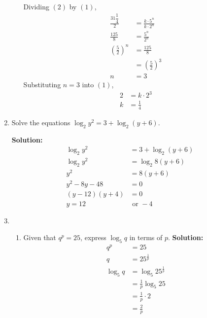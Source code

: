 \documentclass{report}
\newcommand{\sol}{\vspace{0.2cm}\textbf{Solution:}\vspace{0.2cm}}
\begin{document}
\begin{multicols*}{2}
\begin{enumerate}[leftmargin=*]
\begin{enumerate}
                        Dividing $(2)$ by $(1)$,
                        \begin{align*}
                            \frac{31 \dfrac{1}{4}}{2}    & = \frac{k \cdot 5^{n}}{k \cdot 2^{n}} \\
                            \frac{125}{8}                & = \frac{5^{n}}{2^{n}}                 \\
                            \left(\frac{5}{2}\right)^{n} & = \frac{125}{8}                       \\
                                                         & = \left(\frac{5}{2}\right)^{3}        \\
                            n                            & = 3
                        \end{align*}
                        Substituting $n=3$ into $(1)$,
                        \begin{align*}
                            2 & = k \cdot 2^{3} \\
                            k & = \frac{1}{4}
                        \end{align*}
              \end{enumerate}

        \item Solve the equations $\log _2 y^2=3+\log _2(y+6)$.

              \sol{}
              \begin{align*}
                  \log _2 y^2        & = 3+\log _2(y+6) \\
                  \log _2 y^2        & = \log _2 8(y+6) \\
                  y^2                & = 8(y+6)         \\
                  y^2 - 8y - 48      & = 0              \\
                  (y-12)(y+4)        & = 0              \\
                  y             = 12 & \text{ or } -4
              \end{align*}

        \item \begin{enumerate}
                  \item Given that $q^p=25$, express $\log _5 q$ in terms of $p$. \sol{}
                        \begin{align*}
                            q^p      & = 25                      \\
                            q        & = 25^{\frac{1}{p}}        \\
                            \log_5 q & = \log_5 25^{\frac{1}{p}} \\
                                     & = \frac{1}{p} \log_5 25   \\
                                     & = \frac{1}{p} \cdot 2     \\
                                     & = \frac{2}{p}
                        \end{align*}


\end{enumerate}
\end{enumerate}
\end{multicols*}
\end{document}
